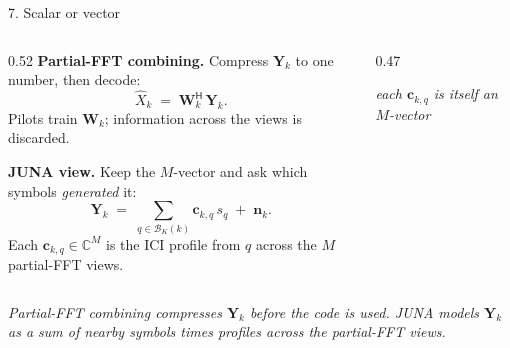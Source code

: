 \documentclass[aspectratio=169,10pt]{beamer}
\newcommand{\vY}{\bm{Y}}
\newcommand{\vc}{\bm{c}}
\newcommand{\vn}{\bm{n}}
\newcommand{\vW}{\bm{W}}
\newcommand{\hX}{\hat{X}}
\newcommand{\herm}{\mathsf{H}}
\newcommand{\Cx}{\mathbb{C}}
\newcommand{\Bk}{\mathcal{B}_K(k)}
\begin{document}
\begin{frame}{7. Scalar or vector}

  \begin{columns}[T,onlytextwidth]
    \begin{column}{0.52\textwidth}
      \textbf{\color{rpcred}Partial-FFT combining.} Compress $\vY_k$ to one number, then decode:
      \[
        \hX_k \;=\; \vW_k^{\herm}\,\vY_k .
      \]
      Pilots train $\vW_k$; information across the views is discarded.

      \vspace{0.3em}
      \textbf{\color{junagreen}JUNA view.} Keep the $M$-vector and ask which symbols \emph{generated} it:
      \[
        \vY_k \;=\; \sum_{q\in\Bk}\vc_{k,q}\,s_q \;+\; \vn_k .
      \]
      Each $\vc_{k,q}\!\in\!\Cx^{M}$ is the ICI profile from $q$ across the $M$ partial-FFT views.
    \end{column}

    \begin{column}{0.47\textwidth}
      \begin{center}
      \end{center}
      \begin{center}{\scriptsize\itshape\color{inkgray}each $\vc_{k,q}$ is itself an $M$-vector}\end{center}
    \end{column}
  \end{columns}

  \begin{center}
    {\itshape\small Partial-FFT combining compresses $\vY_k$ before the code is used.\;
     JUNA models $\vY_k$ as a sum of nearby symbols times profiles across the partial-FFT views.}
  \end{center}
\end{frame}
\end{document}
